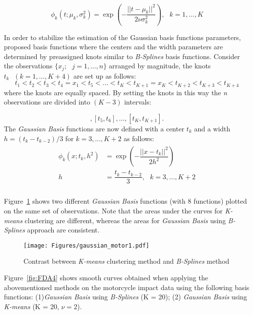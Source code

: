 \begin{equation}
\phi_k(t;\mu_k ,\sigma^2_k) = \exp \left(-\dfrac{||t-\mu_k||^2}{2\nu \sigma^2_k}\right),\textbf{ } k=1,\dots,K
\end{equation}

In order to stabilize the estimation of the Gaussian basis functions parameters, \cite{kawano2007} proposed basis functions where the centers and the width parameters are determined by preassigned knots similar to \textit{B-Splines} basis functions. Consider the observations $\{x_j;\text{ } j=1,\dots,n\}$ arranged by magnitude, the knots $t_k\text{ }(k = 1,\dots,K+4)$ are set up as follows:
\begin{equation}
t_1 < t_2 < t_3 < t_4 = x_1 < t_5 < \dots < t_K < t_{K+1} = x_K < t_{K+2} < t_{K+3} < t_{K+4}
\end{equation}
where the knots are equally spaced. By setting the knots in this way the \textit{n} observations are divided into $(K-3)$ intervals:

\begin{equation}
[t_4,t_5],[t_5,t_6],\dots,[t_K,t_{K+1}].
\end{equation}
The \textit{Gaussian Basis} functions are now defined with a center $t_k$ and a width $h = (t_k - t_{k-2})/3$ for $k = 3,\dots,K+2$ as follows:
\begin{align} 
\begin{split}
\phi_k(x;t_k ,h^2) &= \exp \left(-\dfrac{||x-t_k||^2}{2 h^2}\right)\\
h 	&= \dfrac{t_k - t_{k-2}}{3}, \text{  } k = 3,\dots,K+2\\
\end{split}					
\end{align}

Figure~\ref{fig:FDA45} shows two different \textit{Gaussian Basis} functions (with 8 functions) plotted on the same set of observations. Note that the areas under the curves for \textit{K-means} clustering are different, whereas the areas for \textit{Gaussian Basis} using \textit{B-Splines} approach are consistent.

\begin{figure}[h]
  \centering
    \texttt{[image: Figures/gaussian\_motor1.pdf]}
  \caption[Contrast between \textit{K-means} clustering method and \textit{B-Splines} method]{Contrast between \textit{K-means} clustering method and \textit{B-Splines} method}
  \label{fig:FDA45}
\end{figure}
\clearpage
Figure~\ref{fig:FDA4} shows smooth curves obtained when applying the abovementioned methods on the motorcycle impact data using the following basis functions: (1)\textit{Gaussian Basis} using \textit{B-Splines} (K = 20);  (2) \textit{Gaussian Basis} using \textit{K-means} (K = 20, $\nu = 2$).

